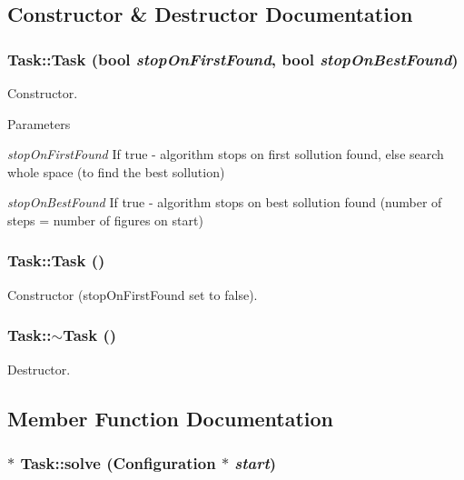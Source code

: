 \subsection{Constructor \& Destructor Documentation}
\hypertarget{class_task_a3b2058bcb0e107d00c57a3d6accb2189}{
\subsubsection[{Task}]{\setlength{\rightskip}{0pt plus 5cm}Task::Task (bool {\em stopOnFirstFound}, \/  bool {\em stopOnBestFound})}}
\label{class_task_a3b2058bcb0e107d00c57a3d6accb2189}


Constructor. 


\begin{DoxyParams}{Parameters}
\item[{\em stopOnFirstFound}]If true -\/ algorithm stops on first sollution found, else search whole space (to find the best sollution) \item[{\em stopOnBestFound}]If true -\/ algorithm stops on best sollution found (number of steps = number of figures on start) \end{DoxyParams}
\hypertarget{class_task_a0ca53354bdc006762a0fda68c64f7608}{
\subsubsection[{Task}]{\setlength{\rightskip}{0pt plus 5cm}Task::Task ()}}
\label{class_task_a0ca53354bdc006762a0fda68c64f7608}


Constructor (stopOnFirstFound set to false). 

\hypertarget{class_task_a3ecf499ea35fb4a96853969a1e1cbbce}{
\subsubsection[{$\sim$Task}]{\setlength{\rightskip}{0pt plus 5cm}Task::$\sim$Task ()}}
\label{class_task_a3ecf499ea35fb4a96853969a1e1cbbce}


Destructor. 



\subsection{Member Function Documentation}
\hypertarget{class_task_a2c184c1af80eb089bb45c6ed83d14fff}{
\subsubsection[{solve}]{ $\ast$ Task::solve ({\bf Configuration} $\ast$ {\em start})}}
\label{class_task_a2c184c1af80eb089bb45c6ed83d14fff}


